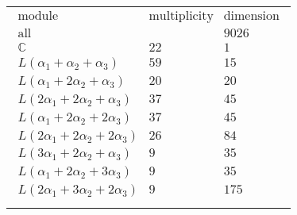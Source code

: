 \documentclass[crop,border=2mm]{standalone}
\begin{document}
\begin{tabular}{l}
$\displaystyle
\begin{array}{rll}
	\text{module}&\text{multiplicity}&\text{dimension} \\ \hline \text{all}&&9026 \\
	\mathbb{C}&22&1\\
	L\left(\alpha_{1}+\alpha_{2}+\alpha_{3}\right)&59&15\\
	L\left(\alpha_{1}+ 2\alpha_{2}+\alpha_{3}\right)&20&20\\
	L\left( 2\alpha_{1}+ 2\alpha_{2}+\alpha_{3}\right)&37&45\\
	L\left(\alpha_{1}+ 2\alpha_{2}+ 2\alpha_{3}\right)&37&45\\
	L\left( 2\alpha_{1}+ 2\alpha_{2}+ 2\alpha_{3}\right)&26&84\\
	L\left( 3\alpha_{1}+ 2\alpha_{2}+\alpha_{3}\right)&9&35\\
	L\left(\alpha_{1}+ 2\alpha_{2}+ 3\alpha_{3}\right)&9&35\\
	L\left( 2\alpha_{1}+ 3\alpha_{2}+ 2\alpha_{3}\right)&9&175
\end{array}
$ \\ \\

\end{tabular}
\end{document}
